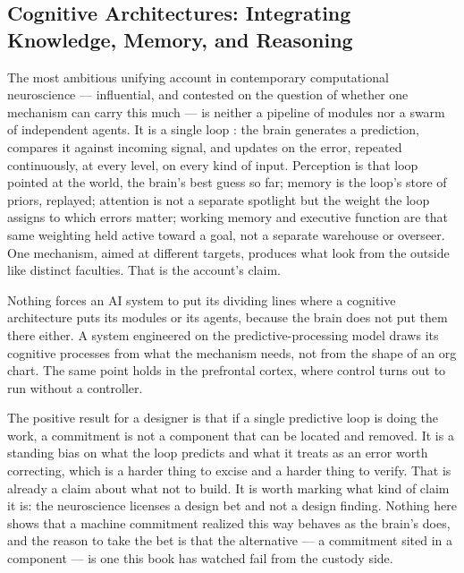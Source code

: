\subsection{Cognitive Architectures: Integrating Knowledge, Memory, and Reasoning}
\label{sec:4.1.1}
The most ambitious unifying account in contemporary computational neuroscience — influential, and contested on the question of whether one mechanism can carry this much — is neither a pipeline of modules nor a swarm of independent agents. It is a single loop \autocite{friston2009freeenergy}: the brain generates a prediction, compares it against incoming signal, and updates on the error, repeated continuously, at every level, on every kind of input. Perception is that loop pointed at the world, the brain's best guess so far; memory is the loop's store of priors, replayed; attention is not a separate spotlight but the weight the loop assigns to which errors matter; working memory and executive function are that same weighting held active toward a goal, not a separate warehouse or overseer. One mechanism, aimed at different targets, produces what look from the outside like distinct faculties. That is the account's claim.

Nothing forces an AI system to put its dividing lines where a cognitive architecture puts its modules or its agents, because the brain does not put them there either. A system engineered on the predictive-processing model draws its cognitive processes from what the mechanism needs, not from the shape of an org chart. The same point holds in the prefrontal cortex, where control turns out to run without a controller.

The positive result for a designer is that if a single predictive loop is doing the work, a commitment is not a component that can be located and removed. It is a standing bias on what the loop predicts and what it treats as an error worth correcting, which is a harder thing to excise and a harder thing to verify. That is already a claim about what not to build. It is worth marking what kind of claim it is: the neuroscience licenses a design bet and not a design finding. Nothing here shows that a machine commitment realized this way behaves as the brain's does, and the reason to take the bet is that the alternative — a commitment sited in a component — is one this book has watched fail from the custody side.
